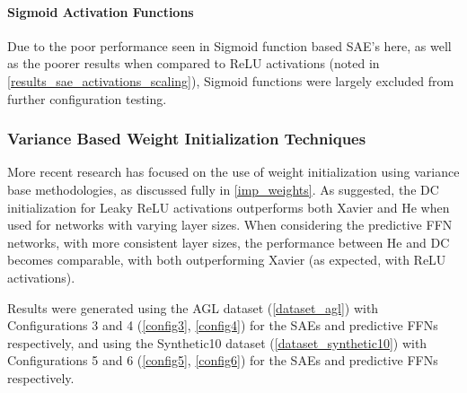 \documentclass[a4paper,latin]{paper}
\begin{document}
\paragraph{Sigmoid Activation Functions} 
Due to the poor performance seen in Sigmoid function based SAE's here, as well as the poorer results when compared to ReLU activations (noted in \ref{results_sae_activations_scaling}), Sigmoid functions were largely excluded from further configuration testing.


\subsubsection{Variance Based Weight Initialization Techniques}

More recent research has focused on the use of weight initialization using variance base methodologies, as discussed fully in \ref{imp_weights}. As suggested, the DC initialization for Leaky ReLU activations outperforms both Xavier and He when used for networks with varying layer sizes. When considering the predictive FFN networks, with more consistent layer sizes, the performance between He and DC becomes comparable, with both outperforming Xavier (as expected, with ReLU activations).\newline

Results were generated using the AGL dataset (\ref{dataset_agl}) with Configurations 3 and 4 (\ref{config3}, \ref{config4}) for the SAEs and predictive FFNs respectively, and using the Synthetic10 dataset (\ref{dataset_synthetic10}) with Configurations 5 and 6 (\ref{config5}, \ref{config6}) for the  SAEs and predictive FFNs respectively.
\end{document}
